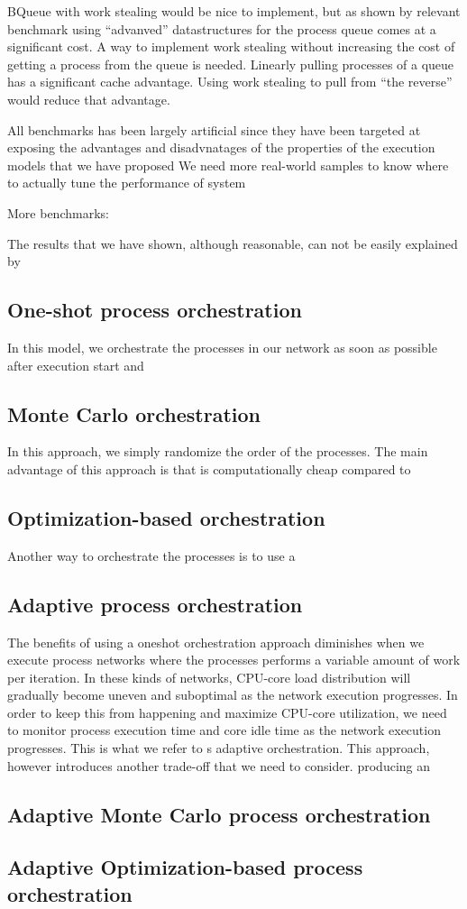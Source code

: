 BQueue with work stealing would be nice to implement, but as shown by
relevant benchmark using ``advanved'' datastructures for the process
queue comes at a significant cost. A way to implement work stealing
without increasing the cost of getting a process from the queue is
needed. Linearly pulling processes of a queue has a significant cache
advantage. Using work stealing to pull from ``the reverse'' would
reduce that advantage. 

All benchmarks has been largely artificial since they have been
targeted at exposing the advantages and disadvnatages of the
properties of the execution models that we have proposed  We need more real-world
samples to know where to actually tune the performance of system

More benchmarks:


The results that we have shown, although reasonable, can not be easily
explained by

\subsection{One-shot process orchestration}
In this model, we orchestrate the processes in our network as soon as
possible after execution start and

\subsection{Monte Carlo orchestration}
In this approach, we simply randomize the order of the processes. The
main advantage of this approach is that is computationally cheap
compared to

\subsection{Optimization-based orchestration}
Another way to orchestrate the processes is to use a


\subsection{Adaptive process orchestration}
The benefits of using a oneshot orchestration approach diminishes when
we execute process networks where the processes performs a variable
amount of work per iteration. In these kinds of networks, CPU-core
load distribution will gradually become uneven and suboptimal as the
network execution progresses. In order to keep this from happening and
maximize CPU-core utilization, we need to monitor process execution
time and core idle time as the network execution progresses. This is
what we refer to s adaptive orchestration. This approach, however
introduces another trade-off that we need to consider. producing an

\subsection{Adaptive Monte Carlo process orchestration}

\subsection{Adaptive Optimization-based process orchestration}



